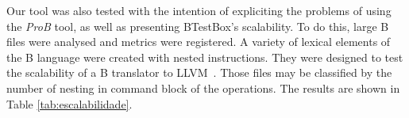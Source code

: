 \documentclass[runningheads]{llncs}
\begin{document}

Our tool was also tested with the intention of expliciting the problems of using the \textit{ProB} tool, as well as presenting BTestBox's scalability. To do this, large B files were analysed and metrics were registered. A variety of lexical elements of the B language were created with nested instructions. They were designed to test the scalability of a B translator to LLVM~\cite{deharbebtestbox}. Those files may be classified by the number of nesting in command block of the operations. %
The results are shown in Table \ref{tab:escalabilidade}.  
\end{document}
